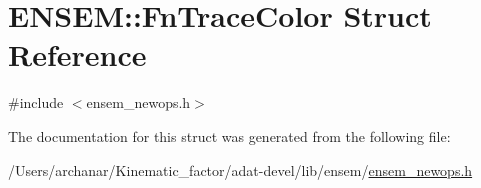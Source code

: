 \hypertarget{structENSEM_1_1FnTraceColor}{}\section{E\+N\+S\+EM\+:\+:Fn\+Trace\+Color Struct Reference}
\label{structENSEM_1_1FnTraceColor}


{\ttfamily \#include $<$ensem\+\_\+newops.\+h$>$}



The documentation for this struct was generated from the following file\+:\begin{DoxyCompactItemize}
\item 
/\+Users/archanar/\+Kinematic\+\_\+factor/adat-\/devel/lib/ensem/\mbox{\hyperlink{adat-devel_2lib_2ensem_2ensem__newops_8h}{ensem\+\_\+newops.\+h}}\end{DoxyCompactItemize}
